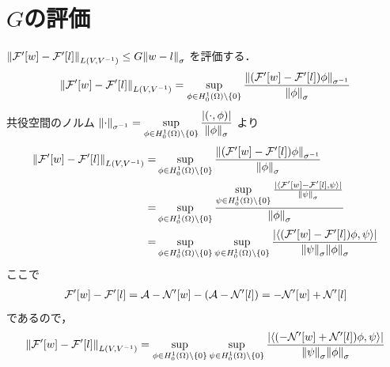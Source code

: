 \section{\(G\)の評価}
\(
    \norm{\mathcal{F}'\qty[w]-\mathcal{F}'\qty[l]}_{L\qty(V,V^{-1})}
    \leq
    G\norm{w-l}_\sigma
\)
を評価する．
\begin{align}
    \norm{\mathcal{F}'\qty[w]-\mathcal{F}'\qty[l]}_{L\qty(V,V^{-1})}
    =
    \sup\limits_{\phi \in H^1_0(\Omega) \backslash \{ 0 \} }
    \dfrac
    {\norm{\qty(\mathcal{F}'\qty[w]-\mathcal{F}'\qty[l])\phi}_{\sigma^{-1}}}
    {\norm{\phi}_{\sigma}} 
\end{align}
共役空間のノルム
\(
    \norm{\cdot}_{\sigma^{-1}}=
    \sup\limits_{\phi \in H^1_0(\Omega) \backslash \{ 0 \} }
    \dfrac{|( \cdot,\phi )|}{\norm{\phi}_\sigma}
\)
より
\begin{align}
    \norm{\mathcal{F}'\qty[w]-\mathcal{F}'\qty[l]}_{L\qty(V,V^{-1})}
    =&
    \sup\limits_{\phi \in H^1_0(\Omega) \backslash \{ 0 \} }
    \frac
    {\norm{\qty(\mathcal{F}'\qty[w]-\mathcal{F}'\qty[l])\phi}_{\sigma^{-1}}}
    {\norm{\phi}_{\sigma}}\\ 
    =&
    \sup\limits_{\phi \in H^1_0(\Omega) \backslash \{ 0 \} }
    \frac
    {\sup\limits_{\psi \in H^1_0(\Omega) \backslash \{ 0 \} }
    \frac
    {|\langle \mathcal{F}'\qty[w]-\mathcal{F}'\qty[l],\psi \rangle|}
    {\norm{\psi}_\sigma}}
    {\norm{\phi}_{\sigma}}\\
    =&
    \sup\limits_{\phi \in H^1_0(\Omega) \backslash \{ 0 \} }
    \sup\limits_{\psi \in H^1_0(\Omega) \backslash \{ 0 \} }
    \frac
    {|\langle \qty(\mathcal{F}'\qty[w]-\mathcal{F}'\qty[l])\phi,\psi \rangle|}
    {\norm{\psi}_\sigma\norm{\phi}_\sigma}
\end{align}
ここで
\begin{align}
    \mathcal{F}'\qty[w]-\mathcal{F}'\qty[l]
    =\mathcal{A} - \mathcal{N}'\qty[w]-\qty(\mathcal{A} - \mathcal{N}'\qty[l])
    =-\mathcal{N}'\qty[w]+\mathcal{N}'\qty[l]
\end{align}
であるので，
\begin{align}
    \norm{\mathcal{F}'\qty[w]-\mathcal{F}'\qty[l]}_{L\qty(V,V^{-1})}
    =
    \sup\limits_{\phi \in H^1_0(\Omega) \backslash \{ 0 \} }
    \sup\limits_{\psi \in H^1_0(\Omega) \backslash \{ 0 \} }
    \frac
    {\qty|\langle \qty(-\mathcal{N}'\qty[w]+\mathcal{N}'\qty[l])\phi,\psi \rangle|}
    {\norm{\psi}_\sigma\norm{\phi}_\sigma}
\end{align}
